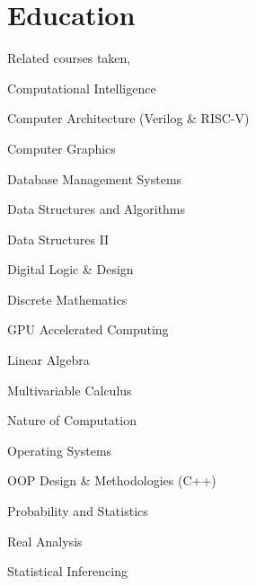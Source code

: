 \documentclass[]{resume}
\begin{document}
\begin{minipage}[t]{0.5\textwidth}
    \section{Education}
     
    Related courses taken,
    \begin{tightemize}
        \item Computational Intelligence
        \item Computer Architecture (Verilog \& RISC-V)
        \item Computer Graphics
        \item Database Management Systems
        \item Data Structures and Algorithms
        \item Data Structures II
        \item Digital Logic \& Design
        \item Discrete Mathematics
        \item GPU Accelerated Computing
        \item Linear Algebra
        \item Multivariable Calculus
        \item Nature of Computation
        \item Operating Systems
        \item OOP Design \& Methodologies (C++)
        \item Probability and Statistics
        \item Real Analysis
        \item Statistical Inferencing
    \end{tightemize}


\end{minipage}
\end{document}

